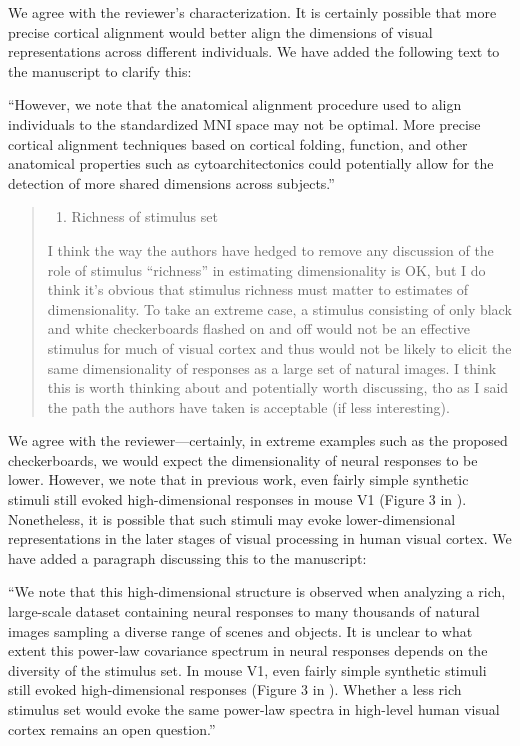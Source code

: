 \documentclass[10pt]{article}
\providecommand{\tightlist}{\setlength{\itemsep}{0pt}\setlength{\parskip}{0pt}}
\begin{document}
We agree with the reviewer's characterization. It is certainly possible that more precise cortical alignment would better align the dimensions of visual representations across different individuals. We have added the following text to the manuscript to clarify this:

``However, we note that the anatomical alignment procedure used to align individuals to the standardized MNI space may not be optimal. More precise cortical alignment techniques based on cortical folding, function, and other anatomical properties such as cytoarchitectonics could potentially allow for the detection of more shared dimensions across subjects.''

\begin{quote}
\begin{enumerate}
\def\labelenumi{\arabic{enumi}.}
\setcounter{enumi}{3}
\tightlist
\item
  Richness of stimulus set
\end{enumerate}

I think the way the authors have hedged to remove any discussion of the role of stimulus ``richness'' in estimating dimensionality is OK, but I do think it's obvious that stimulus richness must matter to estimates of dimensionality. To take an extreme case, a stimulus consisting of only black and white checkerboards flashed on and off would not be an effective stimulus for much of visual cortex and thus would not be likely to elicit the same dimensionality of responses as a large set of natural images. I think this is worth thinking about and potentially worth discussing, tho as I said the path the authors have taken is acceptable (if less interesting).
\end{quote}

We agree with the reviewer---certainly, in extreme examples such as the proposed checkerboards, we would expect the dimensionality of neural responses to be lower. However, we note that in previous work, even fairly simple synthetic stimuli still evoked high-dimensional responses in mouse V1 (Figure 3 in \textcite{Stringer2019}). Nonetheless, it is possible that such stimuli may evoke lower-dimensional representations in the later stages of visual processing in human visual cortex. We have added a paragraph discussing this to the manuscript:

``We note that this high-dimensional structure is observed when analyzing a rich, large-scale dataset containing neural responses to many thousands of natural images sampling a diverse range of scenes and objects. It is unclear to what extent this power-law covariance spectrum in neural responses depends on the diversity of the stimulus set. In mouse V1, even fairly simple synthetic stimuli still evoked high-dimensional responses (Figure 3 in \textcite{Stringer2019}). Whether a less rich stimulus set would evoke the same power-law spectra in high-level human visual cortex remains an open question.''
\end{document}
